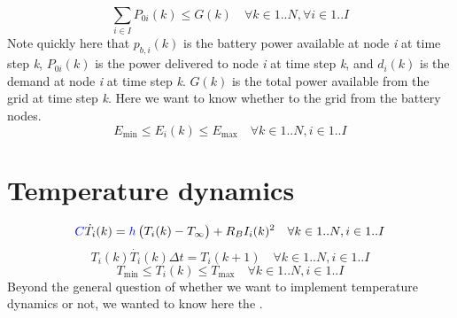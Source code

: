 \documentclass{article}
\begin{document}
\begin{equation}\label{eq6}
	\sum_{i\in I}P_{0i}(k) \leq G(k) \quad \forall k\in 1..N, \forall i\in 1..I
\end{equation}
Note quickly here that $p_{b,i}(k)$ is the battery power available at node \textit{i} at time step \textit{k}, $P_{0i}(k)$ is the power delivered to node \textit{i} at time step \textit{k}, and $d_i(k)$ is the demand at node \textit{i} at time step \textit{k}. $G(k)$ is the total power available from the grid at time step \textit{k}. Here we want to know whether to the grid from the battery nodes.
\begin{equation}\label{eq7}
	E_{\text{min}} \leq E_i(k) \leq E_{\text{max}} \quad \forall k\in 1..N, i\in 1..I
\end{equation}

\section{Temperature dynamics}
\begin{equation}\label{eq8}
	\color{blue}C\color{black}\dot{T_i}(k) = \color{blue}h\color{black}\begin{pmatrix}T_i(k) - T_{\infty}\end{pmatrix} + R_BI_i(k)^2 \quad \forall k\in 1..N, i\in 1..I
\end{equation}
\begin{equation}\label{eq9}
	T_i(k)\dot{T_i}(k)\Delta t = T_i(k+1) \quad \forall k\in 1..N, i\in 1..I
\end{equation}
\begin{equation}\label{eq10}
	T_{\text{min}} \leq T_i(k) \leq T_{\text{max}} \quad \forall k\in 1..N, i\in 1..I
\end{equation}
Beyond the general question of whether we want to implement temperature dynamics or not, we wanted to know here the .
\end{document}
